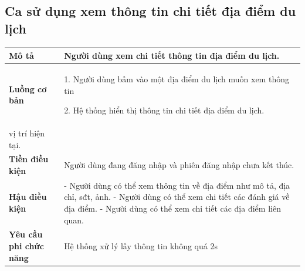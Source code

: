 \subsection{Ca sử dụng xem thông tin chi tiết địa điểm du lịch}
\vspace{0.5cm}


\noindent 
\begin{tabularx}{\linewidth}{| l | X |} 
\hline 
\textbf{Mô tả} & Người dùng xem chi tiết thông tin địa điểm du lịch.  \\ 
\hline 
\textbf{Luồng cơ bản} & 1. Người dùng bấm vào một địa điểm du lịch muốn xem thông tin\newline
                
                        2. Hệ thống hiển thị thông tin chi tiết địa điểm du lịch. \\
                        vị trí hiện tại. \\
                     
\hline 
\textbf{Tiền điều kiện} & Người dùng đang đăng nhập và phiên đăng nhập chưa kết thúc. \\
\hline 
\textbf{Hậu điều kiện} &- Người dùng có thể xem thông tin về địa điểm như mô tả, địa chỉ, sđt, ảnh. \newline
                        - Người dùng có thể xem chi tiết các đánh giá về địa điểm. \newline
                        - Người dùng có thể xem chi tiết các địa điểm liên quan. \\

\hline 
\textbf{Yêu cầu phi chức năng} & Hệ thống xử lý lấy thông tin không quá 2s  \\ 
\hline 
\end{tabularx}

\vspace{0.8cm}

